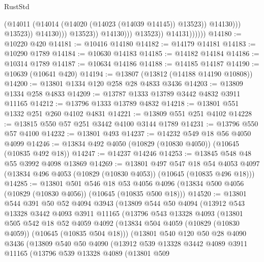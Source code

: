 \begin{lexlean}{RustStd}
\begin{coremodule}
                                            (@14011
                                              (@14014 (@14020 (@14023 (@14039 @14145)) @13523))
                                              @14130)))
                                        @13523))
                                    @14130)))
                              @13523))
                          @14130)))
                    @13523))
                @14131))))))
@14180 := @10220 @420
@14181 := @10416 @14180
@14182 := @14179 @14181
@14183 := @10290 @1789
@14184 := @10630 @14183
@14185 := @14182 @14184
@14186 := @10314 @1789
@14187 := @10634 @14186
@14188 := @14185 @14187
@14190 := @10639 (@10641 @420)
@14194 := @13807 (@13812 (@14188 @14190 @10808))
@14200 := @13801 @1334 @120 @258 @28 @4833 @3436
@14203 := @13809 @1334 @258 @4833
@14209 := @13787 @1333 @13789 @3442 @4832 @3911 @11165
@14212 := @13796 @1333 @13789 @4832
@14218 := @13801 @551 @1332 @251 @260 @4102 @4831
@14221 := @13809 @551 @251 @4102
@14228 := @13815 @550 @57 @251 @3442 @4100 @3144 @1789
@14231 := @13796 @550 @57 @4100
@14232 := @13801 @493
@14237 := @14232 @549 @18 @56 @4050 @4099
@14246 := @13834 @492 @4050 (@10829 (@10830 @4050)) (@10645 (@10835 @492 @18))
@14247 := @14237 @14246
@14253 := @13845 @548 @48 @55 @3992 @4098 @13869
@14269 := @13801
    @497
    @547
    @18
    @54
    @4053
    @4097
    (@13834 @496 @4053 (@10829 (@10830 @4053)) (@10645 (@10835 @496 @18)))
@14285 := @13801
    @501
    @546
    @18
    @53
    @4056
    @4096
    (@13834 @500 @4056 (@10829 (@10830 @4056)) (@10645 (@10835 @500 @18)))
@14520 := @13801
    @544
    @391
    @50
    @52
    @4094
    @3943
    (@13809
      @544
      @50
      @4094
      (@13912
        @543
        @13328
        @3442
        @4093
        @3911
        @11165
        (@13796
          @543
          @13328
          @4093
          (@13801
            @505
            @542
            @18
            @52
            @4059
            @4092
            (@13834 @504 @4059 (@10829 (@10830 @4059)) (@10645 (@10835 @504 @18)))
            (@13801
              @540
              @120
              @50
              @28
              @4090
              @3436
              (@13809
                @540
                @50
                @4090
                (@13912
                  @539
                  @13328
                  @3442
                  @4089
                  @3911
                  @11165
                  (@13796
                    @539
                    @13328
                    @4089
                    (@13801
                      @509

\end{coremodule}
\end{lexlean}
